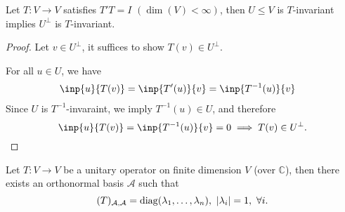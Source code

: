 \begin{proposition}
Let $T:V\to V$ satisfies $T'T=I$ $(\dim(V)<\infty)$, then
$U\le V$ is $T$-invariant implies $U^\perp$ is $T$-invariant.
\end{proposition}
\begin{proof}
Let $v\in U^\perp$, it suffices to show $T(v)\in U^\perp$.

For all $u\in U$, we have
\begin{align*}
\inp{u}{T(v)}&=\inp{T'(u)}{v}=\inp{T^{-1}(u)}{v}
\end{align*}
Since $U$ is $T^{-1}$-invaraint, we imply $T^{-1}(u)\in U$, and therefore 
\[
\inp{u}{T(v)}=\inp{T^{-1}(u)}{v}=0\implies
T(v)\in U^\perp.
\]
\end{proof}

\begin{theorem}
Let $T:V\to V$ be a unitary operator on finite dimension $V$ (over $\mathbb{C}$), then there exists an orthonormal basis $\mathcal{A}$ such that
\[
(T)_{\mathcal{A},\mathcal{A}} = \operatorname{diag}(\lambda_1,\dots,\lambda_n),\ |\lambda_i|=1,\ \forall i.
\]
\end{theorem}

